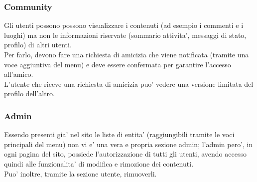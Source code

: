 \documentclass{article}
\begin{document}
\subsubsection{Community}
Gli utenti possono possono visualizzare i contenuti (ad esempio i commenti e i luoghi) ma non le informazioni riservate (sommario attivita', messaggi di stato, profilo) di altri utenti.\\
Per farlo, devono fare una richiesta di amicizia che viene notificata (tramite una voce aggiuntiva del menu) e deve essere confermata per garantire l'accesso all'amico.\\
L'utente che riceve una richiesta di amicizia puo' vedere una versione limitata del profilo dell'altro.
\subsubsection{Admin}
Essendo presenti gia' nel sito le liste di entita' (raggiungibili tramite le voci principali del menu) non vi e' una vera e propria sezione admin; l'admin pero', in ogni pagina del sito, possiede l'autorizzazione di tutti gli utenti, avendo accesso quindi alle funzionalita' di modifica e rimozione dei contenuti.
\\
Puo' inoltre, tramite la sezione utente, rimuoverli.
\end{document}
